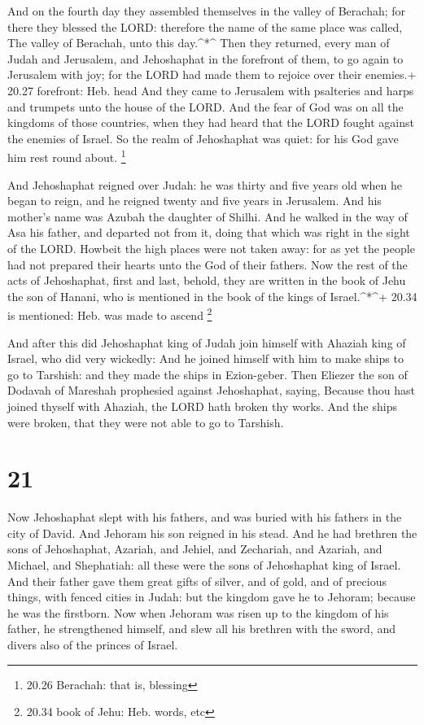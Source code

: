  And on the fourth day they assembled themselves in the
valley of Berachah; for there they blessed the LORD: therefore the name
of the same place was called, The valley of Berachah, unto this
day.\^{}*\^{}  Then they returned, every man of Judah and
Jerusalem, and Jehoshaphat in the forefront of them, to go again to
Jerusalem with joy; for the LORD had made them to rejoice over their
enemies.+ 20.27 forefront: Heb. head  And they came to
Jerusalem with psalteries and harps and trumpets unto the house of the
LORD.  And the fear of God was on all the kingdoms of those
countries, when they had heard that the LORD fought against the enemies
of Israel.  So the realm of Jehoshaphat was quiet: for his
God gave him rest round about. \footnote{20.26 Berachah: that is,
  blessing}

 And Jehoshaphat reigned over Judah: he was thirty and five
years old when he began to reign, and he reigned twenty and five years
in Jerusalem. And his mother's name was Azubah the daughter of Shilhi.
 And he walked in the way of Asa his father, and departed
not from it, doing that which was right in the sight of the LORD.
 Howbeit the high places were not taken away: for as yet
the people had not prepared their hearts unto the God of their fathers.
 Now the rest of the acts of Jehoshaphat, first and last,
behold, they are written in the book of Jehu the son of Hanani, who is
mentioned in the book of the kings of Israel.\^{}*\^{}+ 20.34 is
mentioned: Heb. was made to ascend \footnote{20.34 book of Jehu: Heb.
  words, etc}

 And after this did Jehoshaphat king of Judah join himself
with Ahaziah king of Israel, who did very wickedly:  And he
joined himself with him to make ships to go to Tarshish: and they made
the ships in Ezion-geber.  Then Eliezer the son of Dodavah
of Mareshah prophesied against Jehoshaphat, saying, Because thou hast
joined thyself with Ahaziah, the LORD hath broken thy works. And the
ships were broken, that they were not able to go to Tarshish.

\hypertarget{section-20}{%
\section{21}\label{section-20}}

 Now Jehoshaphat slept with his fathers, and was buried with
his fathers in the city of David. And Jehoram his son reigned in his
stead.  And he had brethren the sons of Jehoshaphat,
Azariah, and Jehiel, and Zechariah, and Azariah, and Michael, and
Shephatiah: all these were the sons of Jehoshaphat king of Israel.
 And their father gave them great gifts of silver, and of
gold, and of precious things, with fenced cities in Judah: but the
kingdom gave he to Jehoram; because he was the firstborn. 
Now when Jehoram was risen up to the kingdom of his father, he
strengthened himself, and slew all his brethren with the sword, and
divers also of the princes of Israel.

